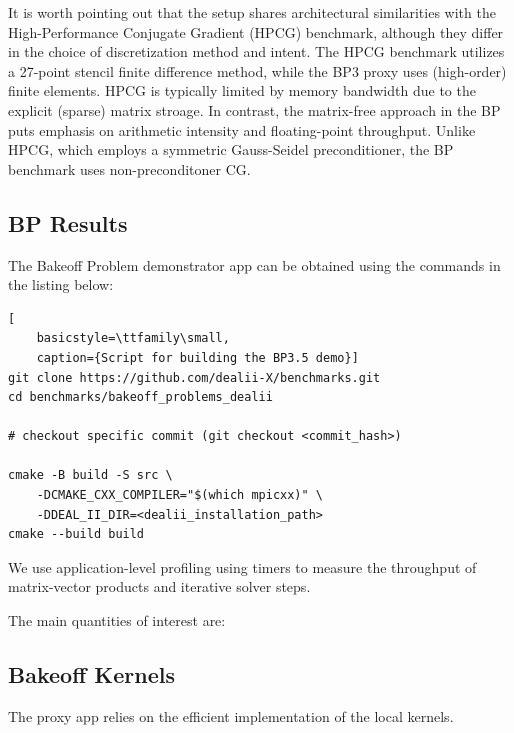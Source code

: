 \documentclass[a4paper,12pt]{article}
\begin{document}
It is worth pointing out that the setup shares architectural similarities
with the High-Performance Conjugate Gradient (HPCG) benchmark,
although they differ in the choice of discretization method and intent.
The HPCG benchmark utilizes a 27-point stencil finite difference method,
while the BP3 proxy uses (high-order) finite elements.
HPCG is typically limited by memory bandwidth due to the explicit (sparse)
matrix stroage.
In contrast, the matrix-free approach in the BP puts emphasis on arithmetic
intensity and floating-point throughput.
Unlike HPCG, which employs a symmetric Gauss-Seidel preconditioner,
the BP benchmark uses non-preconditoner CG.


\subsection{{BP Results}}

The Bakeoff Problem demonstrator app can be obtained using the commands in
the listing below:

\begin{lstlisting}[
    basicstyle=\ttfamily\small,
    caption={Script for building the BP3.5 demo}]
git clone https://github.com/dealii-X/benchmarks.git
cd benchmarks/bakeoff_problems_dealii

# checkout specific commit (git checkout <commit_hash>)

cmake -B build -S src \
    -DCMAKE_CXX_COMPILER="$(which mpicxx)" \
    -DDEAL_II_DIR=<dealii_installation_path>
cmake --build build
\end{lstlisting}

We use application-level profiling using timers to measure the throughput
of matrix-vector products and iterative solver steps.

The main quantities of interest are:




\subsection{{Bakeoff Kernels}}

The proxy app relies on the efficient implementation of the local kernels.

\end{document}
